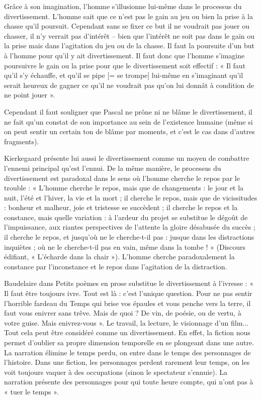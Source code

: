 \documentclass[french]{book}
\theoremstyle{definition}
\begin{document}
Grâce à son imagination, l’homme s’illusionne lui-même dans le processus du divertissement. L’homme sait que ce n’est pas le gain au jeu ou bien la prise à la chasse qu’il poursuit. Cependant sans se fixer ce but il ne voudrait pas jouer ou chasser, il n’y verrait pas d’intérêt – bien que l’intérêt ne soit pas dans le gain ou la prise mais
dans l’agitation du jeu ou de la chasse. Il faut la poursuite d’un but à l’homme pour qu’il y ait divertissement. Il faut donc que l’homme s’imagine poursuivre le gain ou la prise pour que le divertissement soit effectif : « Il faut qu’il s’y échauffe, et qu’il se pipe [= se trompe] lui-même en s’imaginant qu’il serait heureux de gagner ce qu’il ne voudrait pas qu’on lui donnât à condition de ne point jouer ».

Cependant il faut souligner que Pascal ne prône ni ne blâme le divertissement, il ne fait qu’un constat de son importance au sein de l’existence humaine (même si on peut sentir un certain ton de blâme par moments, et c’est le cas dans d’autres fragments).


Kierkegaard présente lui aussi le divertissement comme un moyen de combattre l’ennemi principal qu’est l’ennui. De la même manière, le processus du divertissement est paradoxal dans le sens où l’homme cherche le repos par le trouble : « L’homme cherche le repos, mais que de changements : le jour et la nuit, l’été et l’hiver, la vie et la mort ; il cherche le repos, mais que de vicissitudes : bonheur et malheur, joie et tristesse se succèdent ; il cherche le repos et la constance, mais quelle variation : à l’ardeur du projet se substitue le dégoût de l’impuissance, aux riantes perspectives de l’attente la gloire désabusée du succès ; il cherche le repos, et jusqu’où ne le cherche-t-il pas : jusque dans les distractions inquiètes ; où ne le cherche-t-il pas en vain, même dans la tombe ! » (Discours édifiant, « L’écharde dans la chair »). L’homme cherche paradoxalement la constance par l’inconstance et le repos dans l’agitation de la distraction.

Baudelaire dans Petits poèmes en prose substitue le divertissement à l’ivresse : « Il faut être toujours ivre. Tout est là : c’est l’unique question. Pour ne pas sentir l’horrible fardeau du Temps qui brise vos épaules et vous penche vers la terre, il faut vous enivrer sans trêve. Mais de quoi ? De vin, de poésie, ou de vertu, à votre guise. Mais enivrez-vous ». Le travail, la lecture, le visionnage d’un film... Tout cela peut être considéré comme un divertissement. En effet, la fiction nous permet d’oublier sa propre dimension temporelle en se plongeant dans une autre. La narration élimine le temps perdu, on entre dans le temps des personnages de l’histoire. Dans une fiction, les personnages perdent rarement leur temps, on les voit toujours vaquer à des occupations (sinon le spectateur s’ennuie). La narration présente des personnages pour qui toute heure compte, qui n’ont pas à « tuer le temps ».
\end{document}
